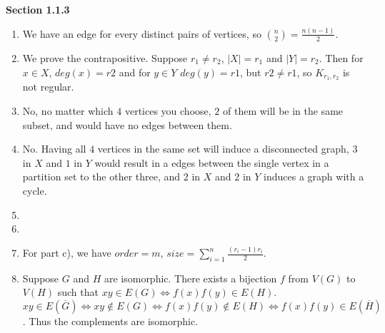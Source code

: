 \documentclass[11pt]{article}
\begin{document}
{\bfseries Section 1.1.3}

\begin{enumerate}[1]
    \item %
        We have an edge for every distinct pairs of vertices, so
        $\binom{n}{2} = \frac{n(n-1)}{2}$.
    \item %
        We prove the contrapositive. Suppose $r_1 \neq r_2$, $|X| = r_1$ and 
        $|Y| = r_2$. Then for $x \in X$, $deg(x) = r2$ and for $y \in Y$ 
        $deg(y) = r1$, but $r2 \neq r1$, so $K_{r_1, r_2}$ is not regular.
    \item %
        No, no matter which $4$ vertices you choose, $2$ of them will be in the 
        same subset, and would have no edges between them. 
    \item %
        No. Having all $4$ vertices in the same set will induce a disconnected
        graph, $3$ in $X$ and $1$ in $Y$ would result in a edges between the 
        single vertex in a partition set to the other three, and $2$ in $X$ 
        and $2$ in $Y$ induces a graph with a cycle.
    \item %
        
    \item %
        
    \item %
        For part c), we have $order = m$, $size = \sum^{n}_{i=1} 
        \frac{(r_i - 1)r_i }{2}$.

    \item %
        Suppose $G$ and $H$ are isomorphic. There exists a bijection $f$ from 
        $V(G)$ to $V(H)$ such that $xy \in E(G) \Leftrightarrow f(x)f(y) \in E(H)$. 
        $$xy \in E(\overline{G}) \Leftrightarrow xy \notin E(G) \Leftrightarrow f(x)f(y) \notin E(H) \Leftrightarrow
        f(x)f(y) \in E(\overline{H})$$. Thus the complements are isomorphic.

        
\end{enumerate}
\end{document}
